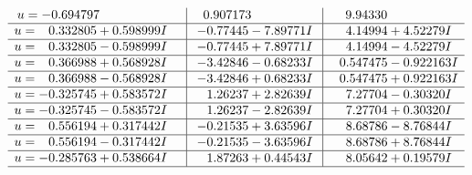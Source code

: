 \documentclass[1p]{elsarticle_modified}
\theoremstyle{definition}
\begin{document}
$$\begin{array}{c|c|c}
\begin{aligned}
u &= -0.694797\phantom{ +0.000000I}\end{aligned}
 & \phantom{-}0.907173\phantom{ +0.000000I} & \phantom{-}9.94330\phantom{ +0.000000I} \\ \hline\begin{aligned}
u &= \phantom{-}0.332805 + 0.598999 I\end{aligned}
 & -0.77445 - 7.89771 I & \phantom{-}4.14994 + 4.52279 I \\ \hline\begin{aligned}
u &= \phantom{-}0.332805 - 0.598999 I\end{aligned}
 & -0.77445 + 7.89771 I & \phantom{-}4.14994 - 4.52279 I \\ \hline\begin{aligned}
u &= \phantom{-}0.366988 + 0.568928 I\end{aligned}
 & -3.42846 - 0.68233 I & \phantom{-}0.547475 - 0.922163 I \\ \hline\begin{aligned}
u &= \phantom{-}0.366988 - 0.568928 I\end{aligned}
 & -3.42846 + 0.68233 I & \phantom{-}0.547475 + 0.922163 I \\ \hline\begin{aligned}
u &= -0.325745 + 0.583572 I\end{aligned}
 & \phantom{-}1.26237 + 2.82639 I & \phantom{-}7.27704 - 0.30320 I \\ \hline\begin{aligned}
u &= -0.325745 - 0.583572 I\end{aligned}
 & \phantom{-}1.26237 - 2.82639 I & \phantom{-}7.27704 + 0.30320 I \\ \hline\begin{aligned}
u &= \phantom{-}0.556194 + 0.317442 I\end{aligned}
 & -0.21535 + 3.63596 I & \phantom{-}8.68786 - 8.76844 I \\ \hline\begin{aligned}
u &= \phantom{-}0.556194 - 0.317442 I\end{aligned}
 & -0.21535 - 3.63596 I & \phantom{-}8.68786 + 8.76844 I \\ \hline\begin{aligned}
u &= -0.285763 + 0.538664 I\end{aligned}
 & \phantom{-}1.87263 + 0.44543 I & \phantom{-}8.05642 + 0.19579 I\\
 \hline 
 \end{array}$$\newpage$$\begin{array}{c|c|c}  

\end{array}$$
\end{document}
